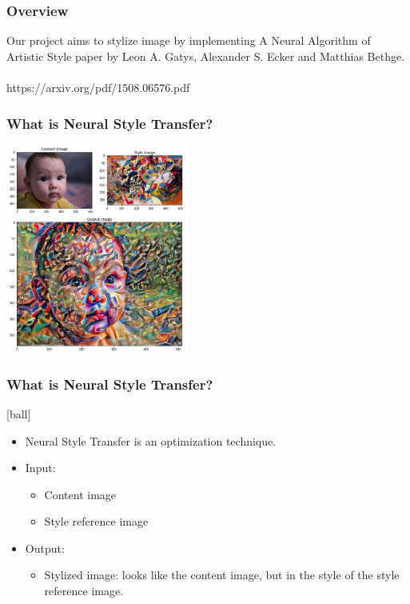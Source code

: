 \documentclass[14pt]{beamer}
\begin{document}
\begin{frame}
		\frametitle{Overview}
		Our project aims to stylize image by implementing A Neural Algorithm of Artistic Style paper by Leon A. Gatys, Alexander S. Ecker and Matthias Bethge. \\~\\

		https://arxiv.org/pdf/1508.06576.pdf
\end{frame}

\begin{frame}
    \frametitle{What is Neural Style Transfer?}
    \begin{center}
        \includegraphics[width=60mm]{baby.jpeg}
    \end{center}
\end{frame}

\begin{frame}
		\frametitle{What is Neural Style Transfer?}
		\begin{itemize}
            \item Neural Style Transfer is an optimization technique.
           \item Input:
		\begin{itemize}
		     \item Content image
		     \item Style reference image
		\end{itemize}
             \item Output:
		\begin{itemize}
             \item Stylized image: looks like the content image, but  in the style of the style
        reference image.
        \end{itemize}
        \end{itemize}
\end{frame}
\end{document}
